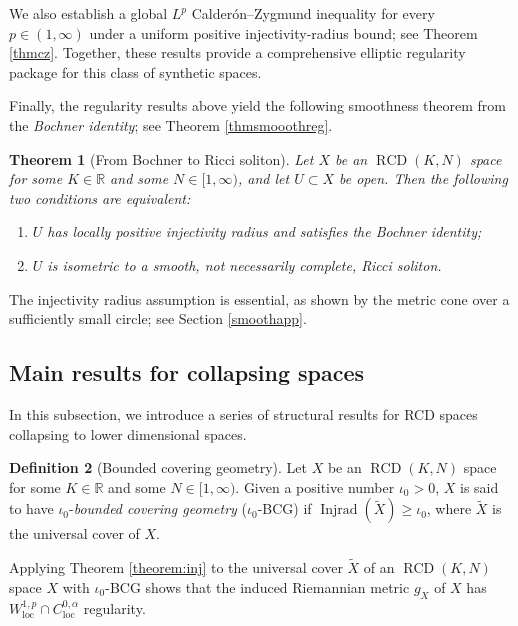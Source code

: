 \documentclass[11pt,reqno]{amsart}
\newtheorem{theorem}{Theorem}[section]
\theoremstyle{definition}
\newtheorem{definition}[theorem]{Definition}
\numberwithin{equation}{section}
\DeclareMathOperator{\Injrad}{Injrad}
\DeclareMathOperator{\loc}{loc}
\DeclareMathOperator{\RCD}{RCD}
\begin{document}
We also establish a global $L^p$ Calder\'on--Zygmund inequality for every $p\in(1,\infty)$ under a uniform positive injectivity-radius bound; see Theorem \ref{thmcz}. Together, these results provide a comprehensive elliptic regularity package for this class of synthetic spaces.



Finally, the regularity results above yield the following smoothness theorem from the \textit{Bochner identity}; see Theorem \ref{thmsmooothreg}.

\begin{theorem}[From Bochner to Ricci soliton]\label{smoothsoli}
    Let $X$ be an $\RCD(K, N)$ space for some $K \in \mathbb{R}$ and some $N \in [1, \infty)$, and let $U\subset X$ be open. Then the following two conditions are equivalent:
    \begin{enumerate}
        \item $U$ has locally positive injectivity radius and satisfies the Bochner identity;
        \item $U$ is isometric to a smooth, not necessarily complete, Ricci soliton.
    \end{enumerate}
\end{theorem}

The injectivity radius assumption is essential, as shown by the metric cone over a sufficiently small circle; see Section \ref{smoothapp}.


\subsection{Main results for collapsing spaces}\label{subseccoppal}






In this subsection, we introduce a series of structural results for RCD spaces collapsing to lower dimensional spaces. 
\begin{definition}
 [Bounded covering geometry] \label{d:BCG}
Let $X$ be an $\RCD(K, N)$ space for some $K \in \mathbb{R}$ and some $N \in [1, \infty)$. Given a positive number  $\iota_0 > 0$, 
$X$ is said to have $\iota_0$-{\it bounded covering geometry} ($\iota_0$-BCG) if  $\Injrad(\widetilde{X}) \geq \iota_0$, where $\widetilde{X}$ is the universal cover of $X$.
\end{definition}

Applying Theorem \ref{theorem:inj} to the universal cover $\widetilde{X}$ of an $\RCD(K,N)$ space $X$ with $\iota_0$-BCG shows that the induced Riemannian metric $g_X$ of $X$ has $W^{1,p}_{\loc}\cap C^{0,\alpha}_{\loc}$ regularity.
\end{document}
